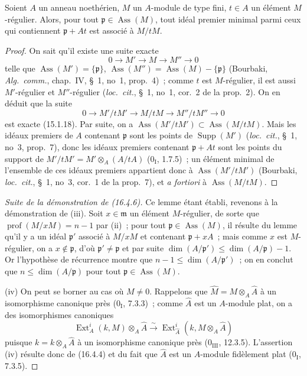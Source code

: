 \begin{lemma}[16.4.6.3]
\label{0.16.4.6.3-fr}
Soient $A$ un anneau noethérien, $M$ un $A$-module de type fini, $t\in A$ un
élément $M$-régulier. Alors, pour tout
$\mathfrak{p}\in\operatorname{Ass}(M)$, tout idéal premier minimal parmi ceux
qui contiennent $\mathfrak{p}+At$ est associé à $M/tM$.
\end{lemma}

\begin{proof}
On sait qu'il existe une suite exacte
\[
  0\to M'\to M\to M''\to0
\]
telle que $\operatorname{Ass}(M')=\{\mathfrak{p}\}$,
$\operatorname{Ass}(M'')=\operatorname{Ass}(M)-\{\mathfrak{p}\}$ (Bourbaki,
\emph{Alg.~comm.}, chap.~IV, \S~1, no~1, prop.~4)~; comme $t$ est
$M$-régulier, il est aussi $M'$-régulier et $M''$-régulier
(\emph{loc.~cit.}, \S~1, no~1, cor.~2 de la prop.~2). On en déduit que la
suite
\[
  0\to M'/tM'\to M/tM\to M''/tM''\to0
\]
est exacte (15.1.18). Par suite, on a
$\operatorname{Ass}(M'/tM')\subset\operatorname{Ass}(M/tM)$. Mais les idéaux
premiers de $A$ contenant $\mathfrak{p}$ sont les points de
$\operatorname{Supp}(M')$ (\emph{loc.~cit.}, \S~1, no~3, prop.~7), donc les
idéaux premiers contenant $\mathfrak{p}+At$ sont les points du support de
$M'/tM'=M'\otimes_A(A/tA)$ ($0_{\mathrm I}$, 1.7.5)~; un élément minimal de
l'ensemble de ces idéaux premiers appartient donc à
$\operatorname{Ass}(M'/tM')$ (Bourbaki, \emph{loc.~cit.}, \S~1, no~3,
cor.~1 de la prop.~7), et \emph{a fortiori} à
$\operatorname{Ass}(M/tM)$.
\end{proof}

\begin{proof}[Suite de la démonstration de (16.4.6)]
Ce lemme étant établi, revenons à la démonstration de (iii). Soit
$x\in\mathfrak{m}$ un élément $M$-régulier, de sorte que
$\operatorname{prof}(M/xM)=n-1$ par (ii)~; pour tout
$\mathfrak{p}\in\operatorname{Ass}(M)$, il résulte du lemme qu'il y a un idéal
$\mathfrak{p}'$ associé à $M/xM$ et contenant $\mathfrak{p}+xA$~; mais comme
$x$ est $M$-régulier, on a $x\notin\mathfrak{p}$, d'où
$\mathfrak{p}'\neq\mathfrak{p}$ et par suite
$\dim(A/\mathfrak{p}')\leq\dim(A/\mathfrak{p})-1$. Or l'hypothèse de
récurrence montre que $n-1\leq\dim(A/\mathfrak{p}')$~; on en conclut que
$n\leq\dim(A/\mathfrak{p})$ pour tout
$\mathfrak{p}\in\operatorname{Ass}(M)$.

(iv) On peut se borner au cas où $M\neq0$. Rappelons que
$\widehat{M}=M\otimes_A\widehat{A}$ à un isomorphisme canonique près
($0_{\mathrm I}$, 7.3.3)~; comme $\widehat{A}$ est un $A$-module plat, on a des
isomorphismes canoniques
\[
  \operatorname{Ext}^i_A(k,M)\otimes_A\widehat{A}
  \xrightarrow{\sim}
  \operatorname{Ext}^i_{\widehat{A}}
  (k,M\otimes_A\widehat{A})
\]
puisque $k=k\otimes_A\widehat{A}$ à un isomorphisme canonique près
($0_{\mathrm{III}}$, 12.3.5). L'assertion (iv) résulte donc de (16.4.4) et du
fait que $\widehat{A}$ est un $A$-module fidèlement plat
($0_{\mathrm I}$, 7.3.5).
\end{proof}

